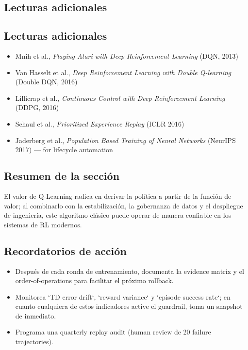 \documentclass[a4paper]{article}
\begin{document}
\subsection{Lecturas adicionales}
\subsection{Lecturas adicionales}

\begin{itemize}
    \item Mnih et al., \textit{Playing Atari with Deep Reinforcement Learning} (DQN, 2013)
    \item Van Hasselt et al., \textit{Deep Reinforcement Learning with Double Q-learning} (Double DQN, 2016)
    \item Lillicrap et al., \textit{Continuous Control with Deep Reinforcement Learning} (DDPG, 2016)
    \item Schaul et al., \textit{Prioritized Experience Replay} (ICLR 2016)
    \item Jaderberg et al., \textit{Population Based Training of Neural Networks} (NeurIPS 2017) — for lifecycle automation
\end{itemize}

\subsection{Resumen de la sección}

El valor de Q-Learning radica en derivar la política a partir de la función de valor; al combinarlo con la estabilización, la gobernanza de datos y el despliegue de ingeniería, este algoritmo clásico puede operar de manera confiable en los sistemas de RL modernos.

\subsection{Recordatorios de acción}

\begin{itemize}
    \item Después de cada ronda de entrenamiento, documenta la evidence matrix y el order-of-operations para facilitar el próximo rollback.
    \item Monitorea `TD error drift`, `reward variance` y `episode success rate`; en cuanto cualquiera de estos indicadores active el guardrail, toma un snapshot de inmediato.
    \item Programa una quarterly replay audit (human review de 20 failure trajectories).
\end{itemize}
\end{document}
